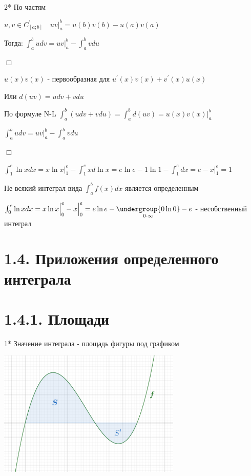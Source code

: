 \documentclass[12pt]{article}
\begin{document}
    2* \hypertarget{integralbyparts}{По частям}

    \Th $u, v \in C^\prime_{[a;b]} \quad uv \Big|_a^b = u(b)v(b) - u(a)v(a)$

    Тогда: $\int^b_a udv = uv \Big|_a^b - \int^b_a vdu$

    $\Box$

    $u(x)v(x)$ - первообразная для $u^\prime(x)v(x) + v^\prime(x)u(x)$

    Или $d(uv) = udv + vdu$

    По формуле N-L $\int_a^b (udv + vdu) = \int^b_a d(uv) = u(x)v(x) \Big|^b_a$

    $\int_a^b udv = uv \Big|^b_a - \int^b_a vdu$

    $\Box$

    \Ex $\int_1^e \ln x dx = x \ln x \Big|^e_1 - \int^e_1 xd\ln x = e \ln e - 1 \ln 1 -
    \int^e_1 dx = e - x \Big|_1^e = 1$

    \Nota Не всякий интеграл вида $\int^b_a f(x) dx $ является определенным

    \Ex $\int^e_0 \ln x dx = x \ln x \Big|_0^e - x \Big|_0^e = e \ln e - \underset{0 \cdot \infty}{\undergroup{0 \ln 0}} - e$ - несобственный интеграл



    \section{1.4. Приложения определенного интеграла}
    \hypertarget{integralapplications}{}

    \section{1.4.1. Площади}

    1* \Mem \hypertarget{integralareadpsk}{Значение интеграла} - площадь фигуры под графиком

    \begin{center}
        \includegraphics[height=6cm]{calculus/images/calculus_2024_02_14_1}
    \end{center}
\end{document}
